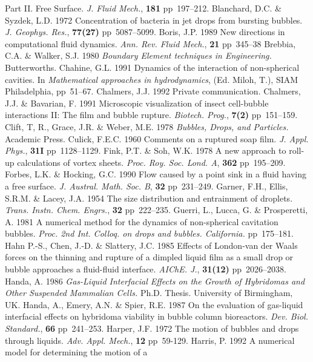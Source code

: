 Part II. Free Surface. {\sl J. Fluid Mech.}, {\bf 181} pp~197--212.
\vskip 8pt
Blanchard, D.C. \& Syzdek, L.D. 1972 Concentration of bacteria in jet drops 
from bursting bubbles. {\sl J. Geophys. Res.}, {\bf 77(27)} pp~5087--5099.
\vskip 8pt
Boris, J.P. 1989 New directions in computational fluid dynamics. 
{\sl Ann. Rev. Fluid
Mech.}, {\bf 21} pp~345--38
\vskip 8pt
Brebbia, C.A. \& Walker, S.J. 1980 {\sl Boundary Element techniques in
Engineering.} Butterworths.
\vskip 8pt
Chahine, G.L. 1991 Dynamics of the interaction of non-spherical
cavities. In {\sl Mathematical approaches in hydrodynamics}, 
(Ed. Miloh, T.), SIAM Philadelphia, pp~51--67.
\vskip 8pt
Chalmers, J.J. 1992 Private communication.
\vskip 8pt
Chalmers, J.J. \& Bavarian, F. 1991
Microscopic visualization of insect cell-bubble interactions II: The film and 
bubble
rupture. {\sl Biotech. Prog.}, {\bf 7(2)} pp~151--159.
\vskip 8pt
Clift, T, R., Grace, J.R. \& Weber, M.E. 1978 {\sl Bubbles, Drops, and Particles.}
Academic Press.
\vskip 8pt
Culick, F.E.C. 1960 Comments on a ruptured soap film. {\sl J. Appl. Phys.},
{\bf 31I} pp~1128--1129.
\vskip 8pt
Fink, P.T. \& Soh, W.K. 1978 A new approach to roll-up 
calculations of vortex sheets. {\sl Proc. Roy. Soc. Lond. A}, 
{\bf 362} pp~195--209.
\vskip 8pt
Forbes, L.K. \& Hocking, G.C. 1990 Flow caused by a point sink in 
a fluid having a free surface. {\sl J. Austral. Math. Soc. B}, 
{\bf 32} pp~231--249.
\vskip 8pt
Garner, F.H., Ellis, S.R.M. \& Lacey, J.A. 1954 The size distribution and
entrainment of droplets. {\sl Trans. Instn. Chem. Engrs.}, {\bf 32} 
pp~222--235.
\vskip 8pt
Guerri, L., Lucca, G. \& Prosperetti, A. 1981 A numerical method for
the dynamics of non-spherical cavitation bubbles. {\sl Proc. 2nd
Int. Colloq. on drops and bubbles. California.} pp~175--181.
\vskip 8pt
Hahn P.-S., Chen, J.-D. \& Slattery, J.C. 1985 Effects of London-van 
der Waals forces on the thinning and rupture of a dimpled liquid
film as a small drop or bubble approaches a fluid-fluid 
interface. {\sl AIChE. J.}, {\bf 31(12)} pp~2026--2038.
\vskip 8pt
Handa, A. 1986 {\sl Gas-Liquid Interfacial Effects on the Growth of
Hybridomas and Other Suspended Mammalian Cells.} Ph.D. Thesis. 
University of Birmingham, UK.
\vskip 8pt
Handa, A., Emery, A.N. \& Spier, R.E. 1987 On the evaluation of gas-liquid
interfacial effects on hybridoma viability in bubble column bioreactors.
{\sl Dev. Biol. Standard.}, {\bf 66} pp~241--253.
\vskip 8pt
Harper, J.F. 1972 The motion of bubbles and drops through liquids.
{\sl Adv. Appl. Mech.}, {\bf 12} pp~59-129.
\vskip 8pt
Harris, P. 1992 A numerical model for determining the motion of a 
